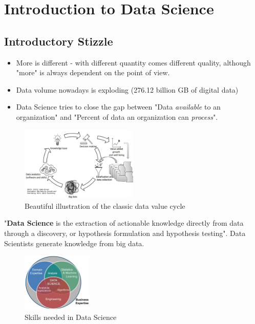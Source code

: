 \documentclass[a4paper]{article}
\begin{document}
	\newpage
	
	\section{Introduction to Data Science}
	
		\subsection{Introductory Stizzle}
		
		\begin{itemize}
			\item More is different - with different quantity comes different quality, although "more" is always dependent on the point of view.
			\item Data volume nowadays is exploding (276.12 billion GB of digital data)
			\item Data Science tries to close the gap between "Data \textit{available} to an organization" and "Percent of data an organization can \textit{process}".
		\end{itemize}
	
		\begin{figure}[htb!]
			\centering
			\includegraphics[width=0.5\textwidth]{img/sw01/data_value_cycle.png}
			\caption{Beautiful illustration of the classic data value cycle}
		\end{figure}
	\noindent
		"\textbf{Data Science} is the extraction of actionable knowledge directly from data through a discovery, or hypothesis formulation and hypothesis testing".
		Data Scientists generate knowledge from big data.
		
		\begin{figure}[htb!]
			\centering
			\includegraphics[width=0.3\textwidth]{img/sw01/ds_skills.png}
			\caption{Skills needed in Data Science}
		\end{figure}
	
\end{document}
